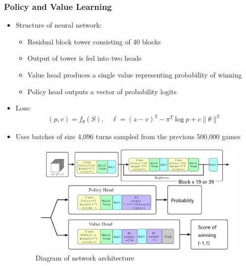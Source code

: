 \documentclass{beamer}
\begin{document}


\begin{frame}
  \frametitle{Policy and Value Learning}

  \begin{itemize}
    \item Structure of neural network:
      \begin{itemize}
        \item Residual block tower consisting of 40 blocks
        \item Output of tower is fed into two heads
        \item Value head produces a single value representing probability of winning
        \item Policy head outputs a vector of probability logits
      \end{itemize}
    \item Loss:
      \begin{gather*}
        (p, v) = f_\theta(S), \quad \ell = (z - v)^2 - \pi^T \log p + c \lVert \theta \rVert^2
      \end{gather*}
    \item Uses batches of size 4,096 turns sampled from the previous 500,000 games
    \begin{figure}
      \includegraphics[width=0.38\linewidth]{./images/network.png}
      \caption{Diagram of network architecture}
    \end{figure}
  \end{itemize}
\end{frame}


\end{document}

